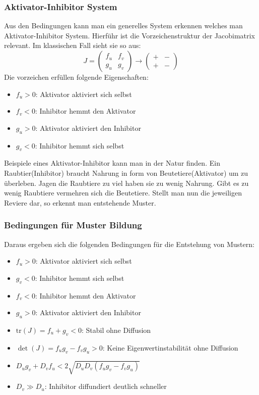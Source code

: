 \subsubsection{Aktivator-Inhibitor System}
Aus den Bedingungen kann man ein generelles System erkennen welches man Aktivator-Inhibitor System.
Hierführ ist die Vorzeichenstruktur der Jacobimatrix relevant.
Im klassischen Fall sieht sie so aus:
\begin{equation*}
        J =
    \begin{pmatrix}
        f_u & f_v\\
        g_u & g_v
    \end{pmatrix} 
    \rightarrow
    \begin{pmatrix}
        + & -\\
        + & -
    \end{pmatrix}
\end{equation*}
Die vorzeichen erfüllen folgende Eigenschaften:
\begin{itemize}
    \item \(f_u > 0\): Aktivator aktiviert sich selbst
    \item \(f_v < 0\): Inhibitor hemmt den Aktivator
    \item \(g_u > 0\): Aktivator aktiviert den Inhibitor
    \item \(g_v < 0\): Inhibitor hemmt sich selbst
\end{itemize}
Beispiele eines Aktivator-Inhibitor kann man in der Natur finden.
Ein Raubtier(Inhibitor) braucht Nahrung in form von Beutetiere(Aktivator) um zu überleben.
Jagen die Raubtiere zu viel haben sie zu wenig Nahrung.
Gibt es zu wenig Raubtiere vermehren sich die Beutetiere.
Stellt man nun die jeweiligen Reviere dar, so erkennt man entstehende Muster.

\subsubsection{Bedingungen für Muster Bildung}
Daraus ergeben sich die folgenden Bedingungen für die Entstehung von Mustern:
        \begin{itemize}
            \item \(f_u > 0\): Aktivator aktiviert sich selbst
            \item \(g_v < 0\): Inhibitor hemmt sich selbst
            \item \(f_v < 0\): Inhibitor hemmt den Aktivator
            \item \(g_u > 0\): Aktivator aktiviert den Inhibitor
            \item \(\text{tr}(J) = f_u + g_v < 0\): Stabil ohne Diffusion
            \item \(\det(J) = f_u g_v - f_v g_u > 0\): Keine Eigenwertinstabilität ohne Diffusion
            \item \(D_u g_v + D_v f_u < 2\sqrt{D_u D_v (f_u g_v - f_v g_u)}\)
            \item \(D_v \gg D_u\): Inhibitor diffundiert deutlich schneller
        \end{itemize}


